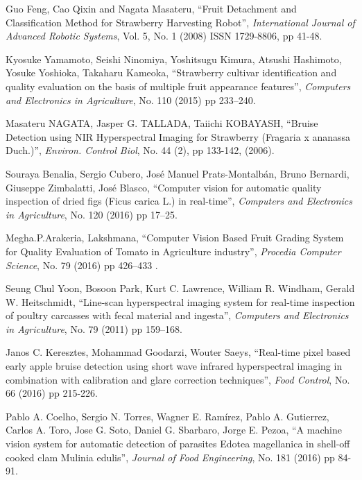 \documentclass[conference]{IEEEtran}
\begin{document}
\begin{thebibliography}{1}
	Guo Feng, Cao Qixin and Nagata Masateru, ``Fruit Detachment and Classification Method for Strawberry Harvesting Robot'', {\em International Journal of Advanced Robotic Systems}, Vol. 5, No. 1 (2008) ISSN 1729-8806, pp 41-48.
	
	Kyosuke Yamamoto, Seishi Ninomiya, Yoshitsugu Kimura, Atsushi Hashimoto, Yosuke Yoshioka, Takaharu Kameoka, ``Strawberry cultivar identification and quality evaluation on the basis of multiple fruit appearance features'', {\em Computers and Electronics in Agriculture}, No. 110 (2015) pp 233–240.
	
	Masateru NAGATA, Jasper G. TALLADA, Taiichi KOBAYASH, ``Bruise Detection using NIR Hyperspectral Imaging for Strawberry (Fragaria x ananassa Duch.)'', {\em Environ. Control Biol}, No.  44 (2), pp 133-142, (2006).

	Souraya Benalia, Sergio Cubero, José Manuel Prats-Montalbán, Bruno Bernardi, Giuseppe Zimbalatti, José Blasco, ``Computer vision for automatic quality inspection of dried figs (Ficus carica L.) in real-time'', {\em Computers and Electronics in Agriculture}, No. 120 (2016) pp 17–25.
	
	Megha.P.Arakeria, Lakshmana, ``Computer Vision Based Fruit Grading System for Quality Evaluation of Tomato in Agriculture industry'', {\em  Procedia Computer Science}, No. 79 (2016) pp 426–433 .

	Seung Chul Yoon, Bosoon Park, Kurt C. Lawrence, William R. Windham, Gerald W. Heitschmidt, ``Line-scan hyperspectral imaging system for real-time inspection of poultry carcasses with fecal material and ingesta'', {\em Computers and Electronics in Agriculture}, No. 79 (2011) pp 159–168.
	
	Janos C. Keresztes, Mohammad Goodarzi, Wouter Saeys, ``Real-time pixel based early apple bruise detection using short wave infrared hyperspectral imaging in combination with calibration and glare correction techniques'', {\em Food Control}, No. 66 (2016) pp 215-226.
	
	Pablo A. Coelho, Sergio N. Torres, Wagner E. Ramírez, Pablo A. Gutierrez, Carlos A. Toro, Jose G. Soto, Daniel G. Sbarbaro, Jorge E. Pezoa, ``A machine vision system for automatic detection of parasites Edotea magellanica in shell-off cooked clam Mulinia edulis'', {\em Journal of Food Engineering}, No. 181 (2016) pp 84-91.
	

\end{thebibliography}
\end{document}
